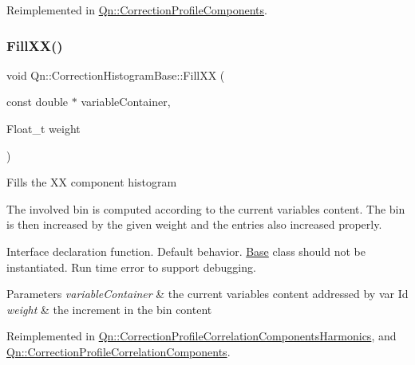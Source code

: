 Reimplemented in \mbox{\hyperlink{classQn_1_1CorrectionProfileComponents_ac95e667193644fda86a55c79e6d8fb35}{Qn\+::\+Correction\+Profile\+Components}}.

\mbox{\label{classQn_1_1CorrectionHistogramBase_a42a813abe035719dddedf2102fbfbdc9}} 
\subsubsection{\texorpdfstring{Fill\+X\+X()}{FillXX()}\hspace{0.1cm}{\footnotesize\ttfamily [1/2]}}
{\footnotesize\ttfamily void Qn\+::\+Correction\+Histogram\+Base\+::\+Fill\+XX (\begin{DoxyParamCaption}\item[{const double $\ast$}]{variable\+Container,  }\item[{Float\+\_\+t}]{weight }\end{DoxyParamCaption})\hspace{0.3cm}{\ttfamily [virtual]}}

Fills the XX component histogram

The involved bin is computed according to the current variables content. The bin is then increased by the given weight and the entries also increased properly.

Interface declaration function. Default behavior. \mbox{\hyperlink{classBase}{Base}} class should not be instantiated. Run time error to support debugging.


\begin{DoxyParams}{Parameters}
{\em variable\+Container} & the current variables content addressed by var Id \\
\hline
{\em weight} & the increment in the bin content \\
\hline
\end{DoxyParams}


Reimplemented in \mbox{\hyperlink{classQn_1_1CorrectionProfileCorrelationComponentsHarmonics_a631174884439d99dee2d04678d1e64aa}{Qn\+::\+Correction\+Profile\+Correlation\+Components\+Harmonics}}, and \mbox{\hyperlink{classQn_1_1CorrectionProfileCorrelationComponents_adebd3ce6b05ef6c65c1288132951ba22}{Qn\+::\+Correction\+Profile\+Correlation\+Components}}.

